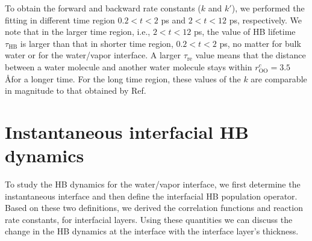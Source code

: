 To obtain the forward and backward rate constants ($k$ and $k'$),
we performed the fitting in different time region $0.2 < t < 2$ ps and $2 < t < 12$ ps, respectively.
We note that in the larger time region, i.e., $2 < t < 12$ ps, the value of HB lifetime $\tau_\text{HB}$ is larger than that in shorter time region, $0.2 < t < 2$ ps,
no matter for bulk water or for the water/vapor interface. A larger $\tau_\text{re}$ value means that the distance between a water molecule and another water molecule 
stays within $r_\text{OO}^c= 3.5$ \AA for a longer time. 
For the long time region, these values of the $k$ are comparable in magnitude to that obtained by Ref. 


\section{Instantaneous interfacial HB dynamics}\label{sec:IHB}
To study the HB dynamics for the water/vapor interface, we first determine the instantaneous interface and then define the interfacial HB population operator. 
Based on these two definitions, we derived the correlation functions and reaction rate constants, for interfacial layers. 
Using these quantities we can discuss the change in the HB dynamics at the interface with the interface layer's thickness.

